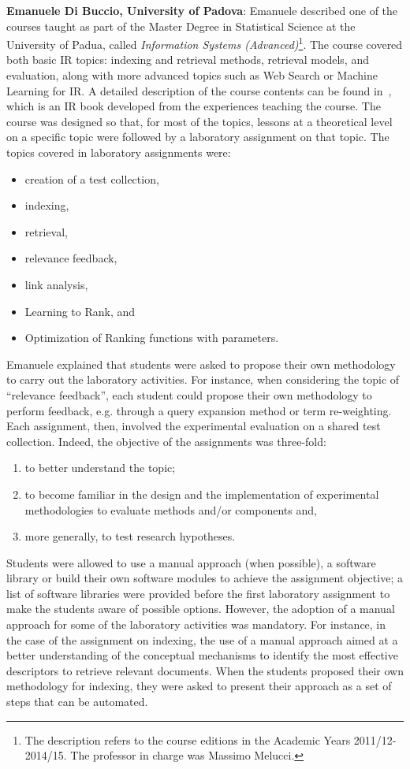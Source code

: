 {\bf Emanuele Di Buccio, University of Padova}:  Emanuele described one of the courses taught as part of the Master Degree in Statistical Science at the University of Padua, called {\em Information Systems (Advanced)}\footnote{\scriptsize{The description refers to the course editions in the Academic Years 2011/12-2014/15. The professor in charge was Massimo Melucci.}}.
The course covered both basic IR topics: indexing and retrieval methods, retrieval models, and evaluation, along with more advanced topics such as Web Search or Machine Learning for IR. A detailed description of the course contents can be found in~\cite{Melucci2013}, which is an IR book developed from the experiences teaching the course.
The course was designed so that, for most of the topics, lessons at a theoretical level on a specific topic were followed by a laboratory assignment on that topic. The topics covered in laboratory assignments were: 
\begin{itemize}
	\item creation of a test collection, 
	\item  indexing, 
	\item retrieval, 
	\item relevance feedback, 
	\item  link analysis, 
	\item Learning to Rank, and
	\item Optimization of Ranking functions with parameters. 
\end{itemize}

Emanuele explained that students were asked to propose their own methodology to carry out the laboratory activities. For instance, when considering the topic of ``relevance feedback'', each student could propose their own methodology to perform feedback, e.g. through a query expansion method or term re-weighting. Each assignment, then, involved the experimental evaluation on a shared test collection. Indeed, the objective of the assignments was three-fold:
\begin{enumerate}
	\item to better understand the topic; 
	\item to become familiar in the design and the implementation of experimental methodologies to evaluate methods and/or components and, 
	\item more  generally, to test research hypotheses.
\end{enumerate}

Students were allowed to use a manual approach (when possible), a software library or build their own software modules to achieve the assignment objective; a list of software libraries were provided before the first laboratory assignment to make the students aware of possible options.
However, the adoption of a manual approach for some of the laboratory activities was mandatory. For instance, in the case of the assignment on indexing, the use of a manual approach aimed at a better understanding of the conceptual mechanisms to identify the most effective descriptors to retrieve relevant documents. When the students proposed their own methodology for indexing, they were asked to present their approach as a set of steps that can be automated.

